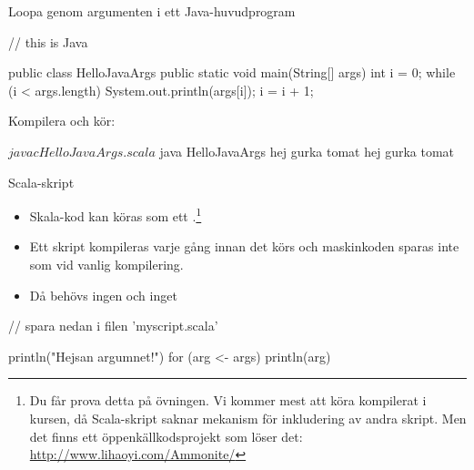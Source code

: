 \begin{Slide}{Loopa genom argumenten i ett Java-huvudprogram}
\begin{Code}[language=Java]
// this is Java 

public class HelloJavaArgs {
    public static void main(String[] args) {
    int i = 0;
    while (i < args.length) { 
      System.out.println(args[i]);
      i = i + 1;
    }
  }
}
\end{Code}
Kompilera och kör:
\begin{REPL}
$ javac HelloJavaArgs.scala
$ java HelloJavaArgs hej gurka tomat 
hej
gurka
tomat
\end{REPL}

\end{Slide}


\begin{Slide}{Scala-skript}
\begin{itemize}
\item Skala-kod kan köras som ett .\footnote{\SlideFontTiny Du får prova detta på övningen. Vi kommer mest att köra kompilerat i kursen, då Scala-skript saknar mekanism för inkludering av andra skript. Men det finns ett öppenkällkodsprojekt som löser det: \url{http://www.lihaoyi.com/Ammonite/}
}
\item Ett skript kompileras varje gång innan det körs och maskinkoden sparas inte som vid vanlig kompilering.
\item Då behövs ingen  och inget 
\end{itemize}

\begin{Code}[basicstyle=\ttfamily\fontsize{10}{12}\selectfont]
// spara nedan i filen 'myscript.scala'

println("Hejsan argumnet!")
for (arg <- args) println(arg)
\end{Code}



\end{Slide}




